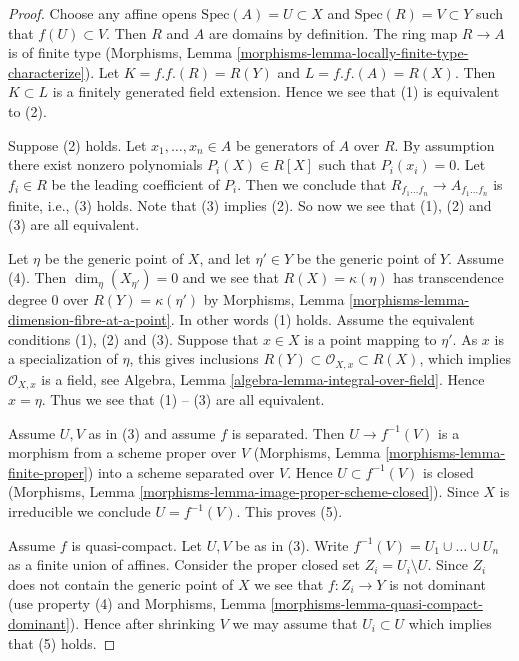 \begin{proof}
Choose any affine opens $\text{Spec}(A) = U \subset X$
and $\text{Spec}(R) = V \subset Y$ such that $f(U) \subset V$.
Then $R$ and $A$ are domains by definition. The ring map
$R \to A$ is of finite type
(Morphisms, Lemma \ref{morphisms-lemma-locally-finite-type-characterize}).
Let $K = f.f.(R) = R(Y)$ and $L = f.f.(A) = R(X)$. Then $K \subset L$
is a finitely generated field extension. Hence we see that
(1) is equivalent to (2).

\medskip\noindent
Suppose (2) holds. Let $x_1, \ldots, x_n \in A$ be generators
of $A$ over $R$. By assumption there exist nonzero polynomials
$P_i(X) \in R[X]$ such that $P_i(x_i) = 0$. Let $f_i \in R$ be the
leading coefficient of $P_i$. Then we conclude that
$R_{f_1 \ldots f_n} \to A_{f_1 \ldots f_n}$ is finite, i.e., (3) holds.
Note that (3) implies (2). So now we see that (1), (2) and (3) are all
equivalent.

\medskip\noindent
Let $\eta$ be the generic point of $X$, and let $\eta' \in Y$ be the
generic point of $Y$. Assume (4). Then
$\dim_\eta(X_{\eta'}) = 0$ and we see that $R(X) = \kappa(\eta)$ has
transcendence degree $0$ over $R(Y) = \kappa(\eta')$ by
Morphisms, Lemma \ref{morphisms-lemma-dimension-fibre-at-a-point}.
In other words (1) holds. Assume the equivalent conditions (1), (2) and
(3). Suppose that $x \in X$ is a point mapping to $\eta'$.
As $x$ is a specialization of $\eta$,
this gives inclusions $R(Y) \subset \mathcal{O}_{X, x} \subset R(X)$,
which implies $\mathcal{O}_{X, x}$ is a field, see
Algebra, Lemma \ref{algebra-lemma-integral-over-field}.
Hence $x = \eta$. Thus we see that (1) -- (3)
are all equivalent.

\medskip\noindent
Assume $U, V$ as in (3) and assume $f$ is separated.
Then $U \to f^{-1}(V)$ is a morphism from a scheme proper over $V$
(Morphisms, Lemma \ref{morphisms-lemma-finite-proper})
into a scheme separated over $V$.
Hence $U \subset f^{-1}(V)$ is closed
(Morphisms, Lemma \ref{morphisms-lemma-image-proper-scheme-closed}).
Since $X$ is irreducible we conclude $U = f^{-1}(V)$. This
proves (5).

\medskip\noindent
Assume $f$ is quasi-compact. Let $U, V$ be as in (3).
Write $f^{-1}(V) = U_1 \cup \ldots \cup U_n$ as a finite union
of affines. Consider the proper closed set $Z_i = U_i \setminus U$.
Since $Z_i$ does not contain the generic point of $X$ we see that
$f : Z_i \to Y$ is not dominant (use property (4) and
Morphisms, Lemma \ref{morphisms-lemma-quasi-compact-dominant}).
Hence after shrinking $V$ we may assume that $U_i \subset U$
which implies that (5) holds.
\end{proof}

